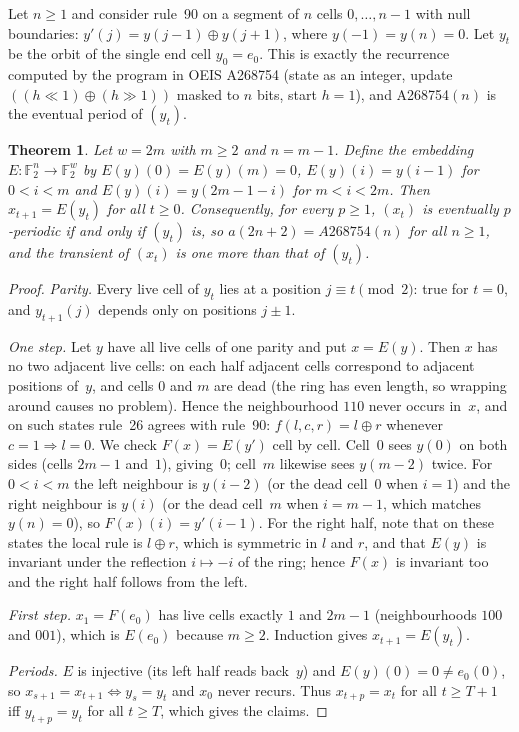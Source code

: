\documentclass[11pt]{article}
\newtheorem{theorem}{Theorem}
\theoremstyle{definition}
\theoremstyle{remark}
\newcommand{\F}{\mathbb{F}}
\begin{document}
Let $n \ge 1$ and consider rule~90 on a segment of $n$ cells $0, \dots, n-1$
with null boundaries: $y'(j) = y(j-1) \oplus y(j+1)$, where $y(-1) = y(n) = 0$.
Let $y_t$ be the orbit of the single end cell $y_0 = e_0$. This is exactly the
recurrence computed by the program in OEIS A268754 (state as an integer,
update $((h \ll 1) \oplus (h \gg 1))$ masked to $n$ bits, start $h = 1$), and
A268754$(n)$ is the eventual period of $(y_t)$.

\begin{theorem}\label{thm:even}
Let $w = 2m$ with $m \ge 2$ and $n = m - 1$. Define the embedding
$E : \F_2^{n} \to \F_2^{w}$ by $E(y)(0) = E(y)(m) = 0$,
$E(y)(i) = y(i-1)$ for $0 < i < m$ and $E(y)(i) = y(2m-1-i)$ for $m < i < 2m$.
Then $x_{t+1} = E(y_t)$ for all $t \ge 0$. Consequently, for every $p \ge 1$,
$(x_t)$ is eventually $p$-periodic if and only if $(y_t)$ is, so
$a(2n+2) = A268754(n)$ for all $n \ge 1$, and the transient of $(x_t)$ is one
more than that of $(y_t)$.
\end{theorem}

\begin{proof}
\emph{Parity.} Every live cell of $y_t$ lies at a position $j \equiv t
\pmod 2$: true for $t = 0$, and $y_{t+1}(j)$ depends only on positions
$j \pm 1$.

\emph{One step.} Let $y$ have all live cells of one parity and put $x = E(y)$.
Then $x$ has no two adjacent live cells: on each half adjacent cells
correspond to adjacent positions of~$y$, and cells $0$ and $m$ are dead (the
ring has even length, so wrapping around causes no problem). Hence the
neighbourhood $110$ never occurs in~$x$, and on such states rule~26 agrees
with rule~90: $f(l,c,r) = l \oplus r$ whenever $c = 1 \Rightarrow l = 0$. We
check $F(x) = E(y')$ cell by cell. Cell~$0$ sees $y(0)$ on both sides (cells
$2m-1$ and~$1$), giving~$0$; cell~$m$ likewise sees $y(m-2)$ twice. For
$0 < i < m$ the left neighbour is $y(i-2)$ (or the dead cell~$0$ when $i = 1$)
and the right neighbour is $y(i)$ (or the dead cell~$m$ when $i = m-1$, which
matches $y(n) = 0$), so $F(x)(i) = y'(i-1)$. For the right half, note that on these states the
local rule is $l \oplus r$, which is symmetric in $l$ and $r$, and that $E(y)$
is invariant under the reflection $i \mapsto -i$ of the ring; hence $F(x)$ is
invariant too and the right half follows from the left.

\emph{First step.} $x_1 = F(e_0)$ has live cells exactly $1$ and $2m-1$
(neighbourhoods $100$ and $001$), which is $E(e_0)$ because $m \ge 2$.
Induction gives $x_{t+1} = E(y_t)$.

\emph{Periods.} $E$ is injective (its left half reads back~$y$) and
$E(y)(0) = 0 \ne e_0(0)$, so $x_{s+1} = x_{t+1} \iff y_s = y_t$ and $x_0$ never
recurs. Thus $x_{t+p} = x_t$ for all $t \ge T+1$ iff $y_{t+p} = y_t$ for all
$t \ge T$, which gives the claims.
\end{proof}
\end{document}
